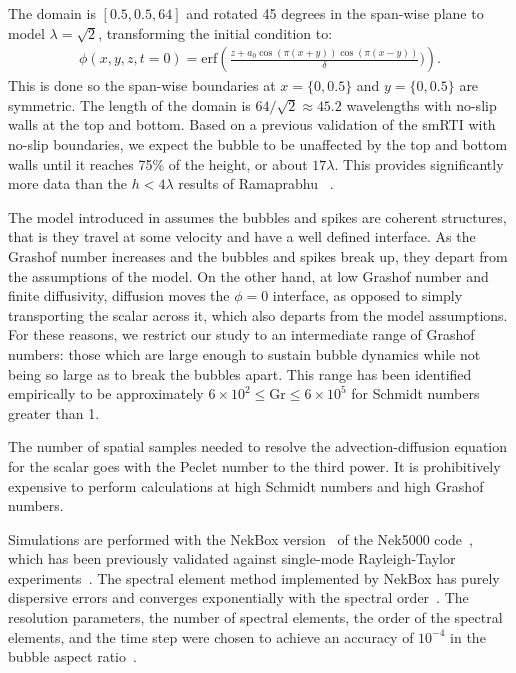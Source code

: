 The domain is $\left[0.5, 0.5, 64\right]$ and rotated 45 degrees in the span-wise plane to model $\lambda = \sqrt{2}$, transforming the initial condition to:
\begin{equation}
\begin{split}
\phi(x,y,z,t=0) = \text{erf}\left(\frac{z + a_0 \cos(\pi (x+y)) \cos(\pi (x-y))}{\delta})\right).
\end{split}
\end{equation}
This is done so the span-wise boundaries at $x=\{0,0.5\}$ and $y=\{0,0.5\}$ are symmetric.
The length of the domain is $64/\sqrt{2} \approx 45.2$ wavelengths with no-slip walls at the top and bottom.
Based on a previous validation of the smRTI with no-slip boundaries, we expect the bubble to be unaffected by the top and bottom walls until it reaches 75\% of the height, or about $17\lambda$.
This provides significantly more data than the $h < 4 \lambda$ results of Ramaprabhu \etal~\cite{Ramaprabhu2012}.

The model introduced in  assumes the bubbles and spikes are coherent structures, that is they travel at some velocity and have a well defined interface.
As the Grashof number increases and the bubbles and spikes break up, they depart from the assumptions of the model.
On the other hand, at low Grashof number and finite diffusivity, diffusion moves the $\phi = 0$ interface, as opposed to simply transporting the scalar across it, which also departs from the model assumptions.
For these reasons, we restrict our study to an intermediate range of Grashof numbers: those which are large enough to sustain bubble dynamics while not being so large as to break the bubbles apart.
This range has been identified empirically to be approximately $6 \times 10^2 \le \text{Gr} \le 6 \times 10^5$ for Schmidt numbers greater than 1.

The number of spatial samples needed to resolve the advection-diffusion equation for the scalar goes with the Peclet number to the third power.
It is prohibitively expensive to perform calculations at high Schmidt numbers and high Grashof numbers.  

Simulations are performed with the NekBox version~\cite{NekBox2} of the Nek5000 code~\cite{argonne:nekdoc}, which has been previously validated against single-mode Rayleigh-Taylor experiments~\cite{Hutchinson2016,Wilkinson2007}.
The spectral element method implemented by NekBox has purely dispersive errors and converges exponentially with the spectral order~\cite{Deville2002}.
The resolution parameters, the number of spectral elements, the order of the spectral elements, and the time step were chosen to achieve an accuracy of $10^{-4}$ in the bubble aspect ratio~\cite{hutchinson2016efficiency}.

